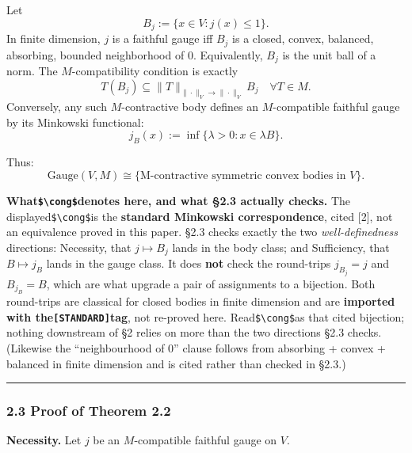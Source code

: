 \documentclass[
  11pt,
]{article}
\begin{document}
Let
\[B_j := \{x \in V : j(x) \leq 1\}.\]
In finite dimension, \(j\) is a faithful gauge iff \(B_j\) is a closed, convex, balanced, absorbing, bounded neighborhood of \(0\). Equivalently, \(B_j\) is the unit ball of a norm. The \(M\)-compatibility condition is exactly
\[
T(B_j) \subseteq \|T\|_{\|\cdot\|_V\to\|\cdot\|_V} B_j \quad \forall T \in M.
\]
Conversely, any such \(M\)-contractive body defines an \(M\)-compatible faithful gauge by its Minkowski functional:
\[j_B(x) := \inf\{\lambda > 0 : x \in \lambda B\}.\]

Thus:
\[\text{Gauge}(V, M) \cong \{\text{M-contractive symmetric convex bodies in } V\}.\]

\textbf{What\texttt{\$\textbackslash{}cong\$}denotes here, and what §2.3 actually checks.} The displayed\texttt{\$\textbackslash{}cong\$}is the \textbf{standard
Minkowski correspondence}, cited {[}2{]}, not an equivalence proved in this paper. §2.3 checks exactly the two
\emph{well-definedness} directions: Necessity, that \(j \mapsto B_j\) lands in the body class; and Sufficiency, that
\(B \mapsto j_B\) lands in the gauge class. It does \textbf{not} check the round-trips \(j_{B_j} = j\) and \(B_{j_B} = B\),
which are what upgrade a pair of assignments to a bijection. Both round-trips are classical for closed bodies in
finite dimension and are \textbf{imported with the\texttt{{[}STANDARD{]}}tag}, not re-proved here. Read\texttt{\$\textbackslash{}cong\$}as that cited
bijection; nothing downstream of §2 relies on more than the two directions §2.3 checks. (Likewise the
``neighbourhood of \(0\)'' clause follows from absorbing + convex + balanced in finite dimension and is cited rather
than checked in §2.3.)

\begin{center}\rule{0.5\linewidth}{0.5pt}\end{center}

\subsubsection{2.3 Proof of Theorem 2.2}\label{proof-of-theorem-2.2}

\textbf{Necessity.} Let \(j\) be an \(M\)-compatible faithful gauge on \(V\).
\end{document}
